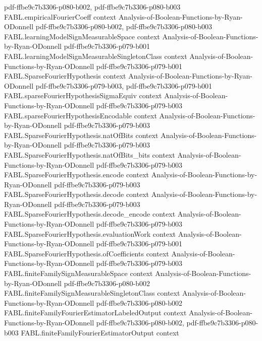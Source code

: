 \begin{theorem}
  {pdf-ffbe9c7b3306-p080-b002,
    pdf-ffbe9c7b3306-p080-b003}
\proofstep
  {FABL.empiricalFourierCoeff}
  {context}
  {Analysis-of-Boolean-Functions-by-Ryan-ODonnell}
  {pdf-ffbe9c7b3306-p080-b002,
    pdf-ffbe9c7b3306-p080-b003}
\proofstep
  {FABL.learningModelSignMeasurableSpace}
  {context}
  {Analysis-of-Boolean-Functions-by-Ryan-ODonnell}
  {pdf-ffbe9c7b3306-p079-b001}
\proofstep
  {FABL.learningModelSignMeasurableSingletonClass}
  {context}
  {Analysis-of-Boolean-Functions-by-Ryan-ODonnell}
  {pdf-ffbe9c7b3306-p079-b001}
\proofstep
  {FABL.SparseFourierHypothesis}
  {context}
  {Analysis-of-Boolean-Functions-by-Ryan-ODonnell}
  {pdf-ffbe9c7b3306-p079-b003,
    pdf-ffbe9c7b3306-p079-b001}
\proofstep
  {FABL.sparseFourierHypothesisSigmaEquiv}
  {context}
  {Analysis-of-Boolean-Functions-by-Ryan-ODonnell}
  {pdf-ffbe9c7b3306-p079-b003}
\proofstep
  {FABL.sparseFourierHypothesisEncodable}
  {context}
  {Analysis-of-Boolean-Functions-by-Ryan-ODonnell}
  {pdf-ffbe9c7b3306-p079-b003}
\proofstep
  {FABL.SparseFourierHypothesis.natOfBits}
  {context}
  {Analysis-of-Boolean-Functions-by-Ryan-ODonnell}
  {pdf-ffbe9c7b3306-p079-b003}
\proofstep
  {FABL.SparseFourierHypothesis.natOfBits_bits}
  {context}
  {Analysis-of-Boolean-Functions-by-Ryan-ODonnell}
  {pdf-ffbe9c7b3306-p079-b003}
\proofstep
  {FABL.SparseFourierHypothesis.encode}
  {context}
  {Analysis-of-Boolean-Functions-by-Ryan-ODonnell}
  {pdf-ffbe9c7b3306-p079-b003}
\proofstep
  {FABL.SparseFourierHypothesis.decode}
  {context}
  {Analysis-of-Boolean-Functions-by-Ryan-ODonnell}
  {pdf-ffbe9c7b3306-p079-b003}
\proofstep
  {FABL.SparseFourierHypothesis.decode_encode}
  {context}
  {Analysis-of-Boolean-Functions-by-Ryan-ODonnell}
  {pdf-ffbe9c7b3306-p079-b003}
\proofstep
  {FABL.SparseFourierHypothesis.evaluationWork}
  {context}
  {Analysis-of-Boolean-Functions-by-Ryan-ODonnell}
  {pdf-ffbe9c7b3306-p079-b001}
\proofstep
  {FABL.SparseFourierHypothesis.ofCoefficients}
  {context}
  {Analysis-of-Boolean-Functions-by-Ryan-ODonnell}
  {pdf-ffbe9c7b3306-p079-b003}
\proofstep
  {FABL.finiteFamilySignMeasurableSpace}
  {context}
  {Analysis-of-Boolean-Functions-by-Ryan-ODonnell}
  {pdf-ffbe9c7b3306-p080-b002}
\proofstep
  {FABL.finiteFamilySignMeasurableSingletonClass}
  {context}
  {Analysis-of-Boolean-Functions-by-Ryan-ODonnell}
  {pdf-ffbe9c7b3306-p080-b002}
\proofstep
  {FABL.finiteFamilyFourierEstimatorLabeledOutput}
  {context}
  {Analysis-of-Boolean-Functions-by-Ryan-ODonnell}
  {pdf-ffbe9c7b3306-p080-b002,
    pdf-ffbe9c7b3306-p080-b003}
\proofstep
  {FABL.finiteFamilyFourierEstimatorOutput}
  {context}

\end{theorem}
